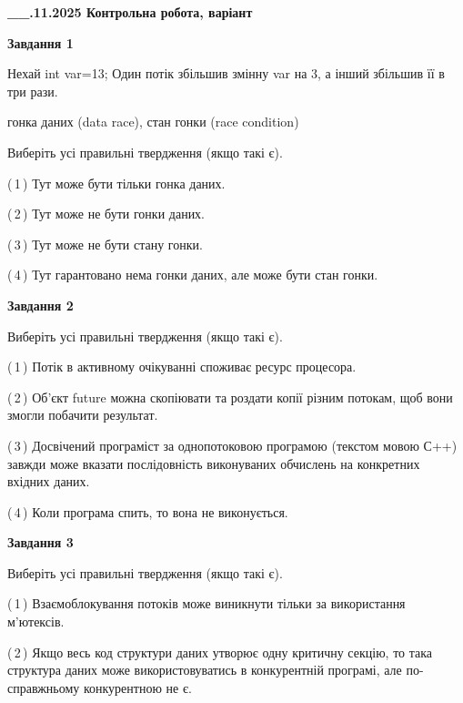 \documentclass[12pt, ukrainian]{article}
\begin{document}
\begin {large}

\textbf{\_\_.11.2025 Контрольна робота, варіант  }\par


{

\begin{center}
\textbf{Завдання 1}
\end{center}
Нехай int var=13; Один потік збільшив змінну var на 3, а інший збільшив її в три рази.

гонка даних (data race), стан гонки (race condition)

Виберіть усі правильні твердження (якщо такі є).\par
\vspace{2mm}
(\,1\,) Тут може бути тільки гонка даних.%

(\,2\,) Тут може не бути гонки даних.%

(\,3\,) Тут може не бути стану гонки.%

(\,4\,) Тут гарантовано нема гонки даних, але може бути стан гонки.%



\begin{center}
\textbf{Завдання 2}
\end{center}
Виберіть усі правильні твердження (якщо такі є).\par
\vspace{2mm}

(\,1\,) Потік в активному очікуванні споживає ресурс процесора.%

(\,2\,) Об’єкт future можна скопіювати та роздати копії різним потокам, щоб вони змогли побачити результат.%

(\,3\,) Досвічений програміст за однопотоковою програмою (текстом мовою С++) завжди може вказати послідовність виконуваних обчислень на конкретних вхідних даних.%

(\,4\,) Коли програма спить, то вона не виконується.%



\begin{center}
\textbf{Завдання 3}
\end{center}
Виберіть усі правильні твердження (якщо такі є).\par
\vspace{2mm}

(\,1\,) Взаємоблокування потоків може виникнути тільки за використання м’ютексів.%

(\,2\,) Якщо весь код структури даних утворює одну критичну секцію, то така структура даних може використовуватись в конкурентній програмі, але по-справжньо\-му конкурентною не є.%

}
\end{large}
\end{document}
